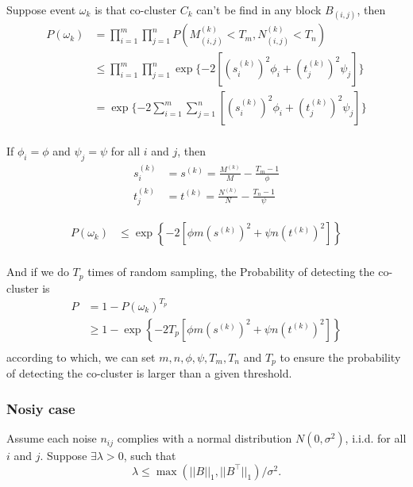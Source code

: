 Suppose event $\omega_k$ is that co-cluster $C_k$ can't be find in any block $B_{(i,j)}$, then
\begin{align*}
    P(\omega_k) & = \prod_{i=1}^m \prod_{j=1}^n P(M_{(i,j)}^{(k)} < T_m, N_{(i,j)}^{(k)} < T_n)                          \\
                & \le \prod_{i=1}^m \prod_{j=1}^n \exp\{-2 \left[ (s_i^{(k)})^2 \phi_i + (t_j^{(k)})^2 \psi_j \right] \} \\
                & = \exp\{-2 \sum_{i=1}^m \sum_{j=1}^n \left[ (s_i^{(k)})^2 \phi_i + (t_j^{(k)})^2 \psi_j \right] \}     \\
\end{align*}

If $\phi_i = \phi$ and $\psi_j = \psi$ for all $i$ and $j$, then
\begin{align*}
    s_i^{(k)} & = s^{(k)} = \frac{M^{(k)}}{M}-\frac{T_m-1}{\phi} \\
    t_j^{(k)} & = t^{(k)} = \frac{N^{(k)}}{N}-\frac{T_n-1}{\psi}
\end{align*}

\begin{align*}
    P(\omega_k) & \le \exp \left\{ -2 [\phi m (s^{(k)})^2 + \psi n (t^{(k)})^2] \right\} \\
\end{align*}


And if we do $T_p$ times of random sampling, the Probability of detecting the co-cluster is
\begin{align*}
    P & = 1 - P(\omega_k)^{T_p}                                                        \\
      & \ge 1 - \exp \left\{ -2 T_p [\phi m (s^{(k)})^2 + \psi n (t^{(k)})^2] \right\} \\
\end{align*}
according to which, we can set $m, n, \phi, \psi, T_m, T_n$ and $T_p$ to ensure the probability of detecting the co-cluster is larger than a given threshold.

\subsubsection{Nosiy case}
Assume each noise $n_{ij}$ complies with a normal distribution $N(0, \sigma^2)$, i.i.d. for all $i$ and $j$. Suppose $\exists \lambda > 0$, such that
$$\lambda \le \max(||B||_1, ||B^\top||_1)/\sigma^2.$$

